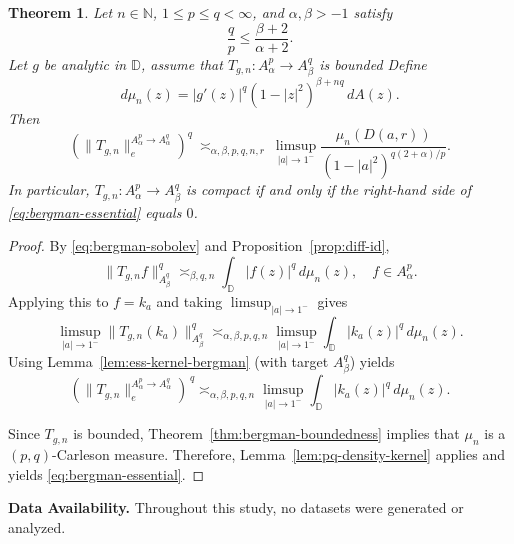 \documentclass[preprint,12pt]{elsarticle}
\numberwithin{equation}{section}
\newtheorem{theorem}{Theorem}[section]
\theoremstyle{remark}
\begin{document}
\begin{theorem}\label{thm:bergman-essential-norm}
Let $n\in\mathbb N$, $1\le p\le q<\infty$, and $\alpha,\beta>-1$ satisfy
\begin{equation*}
\frac{q}{p}\le \frac{\beta+2}{\alpha+2}.
\end{equation*}
Let $g$ be analytic in $\mathbb D$, assume that $T_{g,n}:A_\alpha^p\to A_\beta^q$ is bounded Define
\begin{equation*}
d\mu_n(z)=|g'(z)|^q(1-|z|^2)^{\beta+nq}\,dA(z).
\end{equation*}
Then
\begin{equation}\label{eq:bergman-essential}
\left(\|T_{g,n}\|_{e}^{A_\alpha^p\to A_\alpha^q}\right)^{q}
\ \asymp_{\alpha,\beta,p,q,n,r}\
\limsup_{|a|\to 1^-}
\frac{\mu_n(D(a,r))}{(1-|a|^2)^{q(2+\alpha)/p}}.
\end{equation}
In particular, $T_{g,n}:A_\alpha^p\to A_\beta^q$ is compact if and only if the right-hand side of
\eqref{eq:bergman-essential} equals $0$.
\end{theorem}

\begin{proof}
By \eqref{eq:bergman-sobolev} and Proposition~\ref{prop:diff-id},
\begin{equation*}
\|T_{g,n}f\|_{A_\beta^q}^q\asymp_{\beta,q,n}\int_{\mathbb D}|f(z)|^q\,d\mu_n(z),
\quad f\in A_\alpha^p.
\end{equation*}
Applying this to $f=k_a$ and taking $\limsup_{|a|\to 1^-}$ gives
\begin{equation*}
\limsup_{|a|\to 1^-}\|T_{g,n}(k_a)\|_{A_\beta^q}^q
\asymp_{\alpha,\beta,p,q,n}
\limsup_{|a|\to 1^-}\int_{\mathbb D}|k_a(z)|^q\,d\mu_n(z).
\end{equation*}
Using Lemma~\ref{lem:ess-kernel-bergman} (with target $A_\beta^q$) yields
\begin{equation*}
\left(\|T_{g,n}\|_{e}^{A_\alpha^p\to A_\alpha^q}\right)^{\,q}
\asymp_{\alpha,\beta,p,q,n}
\limsup_{|a|\to 1^-}\int_{\mathbb D}|k_a(z)|^q\,d\mu_n(z).
\end{equation*}

Since $T_{g,n}$ is bounded, Theorem~\ref{thm:bergman-boundedness} implies that $\mu_n$ is a $(p,q)$-Carleson measure. Therefore, Lemma~\ref{lem:pq-density-kernel} applies and yields \eqref{eq:bergman-essential}.
\end{proof}

\medskip
\noindent
\textbf{Data Availability.} Throughout this study, no datasets were generated or analyzed.
\end{document}
